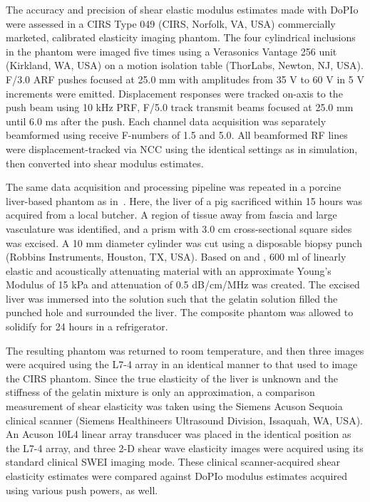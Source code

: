The accuracy and precision of shear elastic modulus estimates made with DoPIo were assessed in a CIRS Type 049 (CIRS, Norfolk, VA, USA) commercially marketed, calibrated elasticity imaging phantom. The four cylindrical inclusions in the phantom were imaged five times using a Verasonics Vantage 256 unit (Kirkland, WA, USA) on a motion isolation table (ThorLabs, Newton, NJ, USA). F/3.0 ARF pushes focused at 25.0 mm with amplitudes from 35 V to 60 V in 5 V increments were emitted. Displacement responses were tracked on-axis to the push beam using 10 kHz PRF, F/5.0 track transmit beams focused at 25.0 mm until 6.0 ms after the push. Each channel data acquisition was separately beamformed using receive F-numbers of 1.5 and 5.0. All beamformed RF lines were displacement-tracked via NCC using the identical settings as in simulation, then converted into shear modulus estimates.

The same data acquisition and processing pipeline was repeated in a porcine liver-based phantom as in~\cite{hossain_Viscoelastic_2020}. Here, the liver of a pig sacrificed within 15 hours was acquired from a local butcher. A region of tissue away from fascia and large vasculature was identified, and a prism with 3.0 cm cross-sectional square sides was excised. A 10 mm diameter cylinder was cut using a disposable biopsy punch (Robbins Instruments, Houston, TX, USA). Based on \cite{madsen_Tissue_1978} and \cite{hall_Phantom_1997}, 600 ml of linearly elastic and acoustically attenuating material with an approximate Young's Modulus of 15 kPa and attenuation of 0.5 dB/cm/MHz was created. The excised liver was immersed into the solution such that the gelatin solution filled the punched hole and surrounded the liver. The composite phantom was allowed to solidify for 24 hours in a refrigerator.

The resulting phantom was returned to room temperature, and then three images were acquired using the L7-4 array in an identical manner to that used to image the CIRS phantom. Since the true elasticity of the liver is unknown and the stiffness of the gelatin mixture is only an approximation, a comparison measurement of shear elasticity was taken using the Siemens Acuson Sequoia clinical scanner (Siemens Healthineers Ultrasound Division, Issaquah, WA, USA). An Acuson 10L4 linear array transducer was placed in the identical position as the L7-4 array, and three 2-D shear wave elasticity images were acquired using its standard clinical SWEI imaging mode. These clinical scanner-acquired shear elasticity estimates were compared against DoPIo modulus estimates acquired using various push powers, as well.

